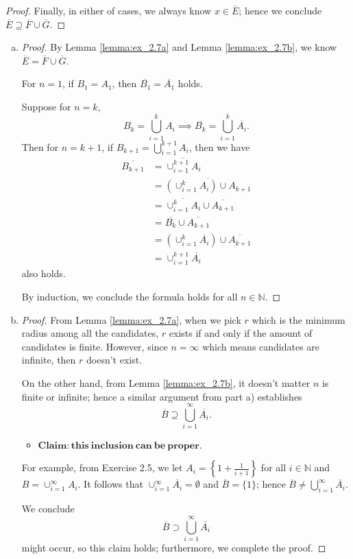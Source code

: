 \begin{Exercise}
\begin{proof}
		Finally, in either of cases, we always know $x\in \overline{E}$; hence we conclude $\overline{E} \supseteq \overline{F}\cup\overline{G}$.
	\end{proof}
	\begin{enumerate}[a)]
		\item
		\begin{proof}
			By Lemma \ref{lemma:ex_2.7a} and Lemma \ref{lemma:ex_2.7b}, we know $\overline{E} = \overline{F}\cup\overline{G}$.
			
			For $n=1$, if $B_1 = A_1$, then $\overline{B_1} = \overline{A_1}$ holds.
			
			Suppose for $n=k$, 
			$$
			B_k = \bigcup_{i=1}^{k}A_i \implies \overline{B_k} = \bigcup_{i=1}^{k}\overline{A_i}.
			$$
			Then for $n=k+1$, if $B_{k+1} = \bigcup_{i=1}^{k+1}A_i$, then we have
			\begin{align*}
			\overline{B_{k+1}}
			&= \overline{\cup_{i=1}^{k+1}A_i} \\
			&= \overline{\left( \cup_{i=1}^{k}A_i \right) \cup A_{k+1}} \\
			&= \overline{\cup_{i=1}^{k}A_i} \cup \overline{A_{k+1}} \\
			&= \overline{B_k} \cup \overline{A_{k+1}} \\
			&= \left( \cup_{i=1}^{k}\overline{A_i} \right) \cup \overline{A_{k+1}} \\
			&= \cup_{i=1}^{k+1}\overline{A_i}
			\end{align*}
			also holds. 
			
			By induction, we conclude the formula holds for all $n\in\mathbb{N}$.
		\end{proof}
		
		\item
		\begin{proof}
			From Lemma \ref{lemma:ex_2.7a}, when we pick $r$ which is the minimum radius among all the candidates, $r$ exists if and only if the amount of candidates is finite. However, since $n=\infty$ which means candidates are infinite, then $r$ doesn't exist.
			
			On the other hand, from Lemma \ref{lemma:ex_2.7b}, it doesn't matter $n$ is finite or infinite; hence a similar argument from part a) establishes
			$$
			\overline{B} \supseteq \bigcup_{i=1}^{\infty}\overline{A_i}.
			$$
			
			\begin{itemize}
				\item $\mathbf{Claim:this\ inclusion\ can\ be\ proper.}$
			\end{itemize}
			
			For example, from Exercise 2.5, we let $A_i = \left\{ 1+\frac{1}{i+1} \right\}$ for all $i\in\mathbb{N}$ and $B=\cup_{i=1}^{\infty} A_i$. It follows that $\cup_{i=1}^{\infty}\overline{A_i} = \emptyset$ and $\overline{B} = \{1\}$; hence $\overline{B} \neq \bigcup_{i=1}^{\infty}\overline{A_i}$.
			
			We conclude
			$$
			\overline{B} \supset \bigcup_{i=1}^{\infty}\overline{A_i}
			$$
			might occur, so this claim holds; furthermore, we complete the proof.
		\end{proof}
	\end{enumerate}
\end{Exercise}